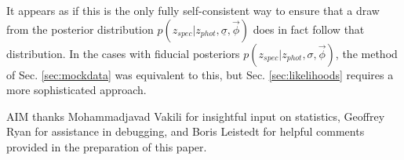 \documentclass[iop]{emulateapj}
\newcommand{\textul}{\underline}
\begin{document}
It appears as if this is the only fully self-consistent way to ensure that a draw from the posterior distribution $p(z_{spec} | z_{phot}, \textul{\sigma}, \vec{\phi})$ does in fact follow that distribution.  In the cases with fiducial posteriors $p(z_{spec} | z_{phot}, \sigma, \vec{\phi})$, the method of Sec. \ref{sec:mockdata} was equivalent to this, but Sec. \ref{sec:likelihoods} requires a more sophisticated approach.

\begin{acknowledgements}
AIM thanks Mohammadjavad Vakili for insightful input on statistics, Geoffrey Ryan for assistance in debugging, and Boris Leistedt for helpful comments provided in the preparation of this paper.
\end{acknowledgements}

%
%
\end{document}
